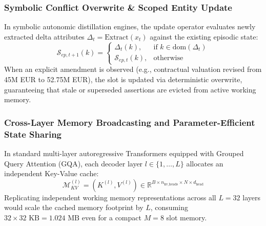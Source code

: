 \documentclass[11pt,a4paper]{article}
\begin{document}
\subsubsection{Symbolic Conflict Overwrite \& Scoped Entity Update}
In symbolic autonomic distillation engines, the update operator evaluates newly extracted delta attributes $\Delta_t = \text{Extract}(x_t)$ against the existing episodic state:
\begin{equation}
\mathcal{S}_{ep, t+1}(k) = \begin{cases} \Delta_t(k), & \text{if } k \in \text{dom}(\Delta_t) \\ \mathcal{S}_{ep, t}(k), & \text{otherwise} \end{cases}
\end{equation}
When an explicit amendment is observed (e.g., contractual valuation revised from 45M EUR to 52.75M EUR), the slot is updated via deterministic overwrite, guaranteeing that stale or superseded assertions are evicted from active working memory.

\subsubsection{Cross-Layer Memory Broadcasting and Parameter-Efficient State Sharing}
In standard multi-layer autoregressive Transformers equipped with Grouped Query Attention (GQA), each decoder layer $l \in \{1, \dots, L\}$ allocates an independent Key-Value cache:
\begin{equation}
\mathcal{M}_{KV}^{(l)} = (K^{(l)}, V^{(l)}) \in \mathbb{R}^{B \times n_{\text{kv\_heads}} \times N \times d_{\text{head}}}
\end{equation}
Replicating independent working memory representations across all $L = 32$ layers would scale the cached memory footprint by $L$, consuming $32 \times 32\text{ KB} = 1.024\text{ MB}$ even for a compact $M = 8$ slot memory.
\end{document}

